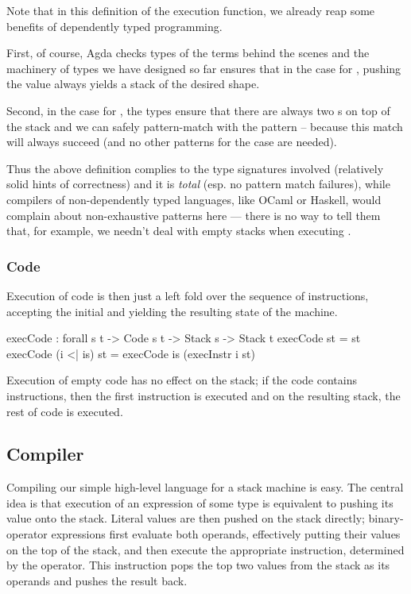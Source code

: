 Note that in this definition of the execution function, we already reap some
benefits of dependently typed programming.

First, of course, Agda checks types of the terms behind
the scenes and the machinery of types we have designed so far ensures that
in the case for , pushing the value  always yields
a stack of the desired shape.

Second, in the case for , the types ensure that there are always two
s on top of the stack and we can safely pattern-match with the
pattern  \scons {} \scons {} -- because this match
will always succeed (and no other patterns for the  case are needed). 

Thus the above definition complies to the type signatures involved (relatively
solid hints of correctness) and it is \emph{total} (esp. no pattern match failures),
while compilers of non-dependently typed languages, like OCaml or Haskell,
would complain about non-exhaustive patterns here --- there is no way to tell them
that, for example, we needn't deal with empty stacks when executing .


\subsubsection{Code}

Execution of code is then just a left fold over the sequence of instructions,
accepting the initial and yielding the resulting state of the machine.

\begin{code}
  execCode : forall {s t} -> Code s t -> Stack s -> Stack t
  execCode \nil st = st
  execCode (i <| is) st = execCode is (execInstr i st)
\end{code}

\noindent Execution of empty code has no effect on the stack; if the code
contains instructions, then the first instruction is executed and on the
resulting stack, the rest of code is executed.

\subsection{Compiler}

Compiling our simple high-level language for a stack machine is easy. The
central idea is that execution of an expression of some type is equivalent to
pushing its value onto the stack. Literal values are then pushed on the stack
directly; binary-operator expressions first evaluate both operands, effectively
putting their values on the top of the stack, and then execute the appropriate
instruction, determined by the operator. This instruction pops the top
two values from the stack as its operands and pushes the result back.

